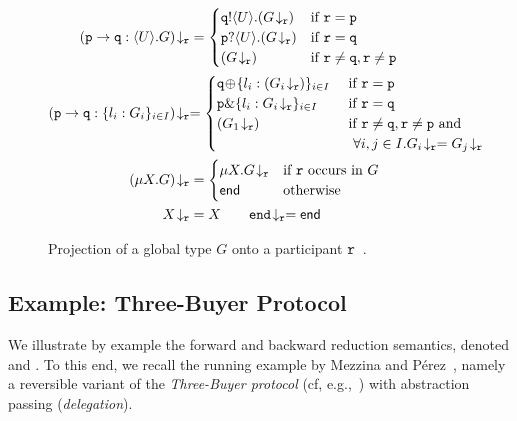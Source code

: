 \documentclass[runningheads,plain]{llncs}
\begin{document}
\begin{figure}[!t]
{
\begin{align*}
\tproj{(\gtcom{p}{q}{U}{G})}{\gpart{r}} & = 
\begin{cases}
\ltout{q}{U}{(\tproj{G}{\gpart{r}})} & \text{if $\gpart{r} = \gpart{p}$} \\
\ltinp{p}{U}{(\tproj{G}{\gpart{r}})} & \text{if $\gpart{r} = \gpart{q}$} \\
(\tproj{G}{\gpart{r}}) &  \text{if $\gpart{r} \neq \gpart{q}, \gpart{r} \neq \gpart{p}$}
\end{cases}
\\
\tproj{(\gtcho{p}{q}{l_i}{G_i})}{\gpart{r}}  
& 
{= 
\begin{cases}
\ltsel{q}{\lbl_i}{(\tproj{G_i}{\gpart{r}})}{i}{I}  & \text{ if $\gpart{r} = \gpart{p}$} \\
\ltbra{p}{\lbl_i}{\tproj{G_i}{\gpart{r}}}{i}{I}  & \text{ if $\gpart{r} = \gpart{q}$} \\
(\tproj{{G_1}}{\gpart{r}}) &  \text{ if $\gpart{r} \neq \gpart{q}, \gpart{r} \neq \gpart{p}$ and} \\ 
& \text{~~$\forall i, j \in I. \tproj{{G_i}}{\gpart{r}} = \tproj{{G_j}}{\gpart{r}}$}
\end{cases}
}
\\
\tproj{(\mu X. G)}{\gpart{r}} &= 
\begin{cases}
\mu X. \tproj{G}{\gpart{r}} & \text{if $\gpart{r}$ occurs in $G$}
\\
\lend & \text{otherwise}
\end{cases}
\\
\tproj{X}{\gpart{r}} & = X
\qquad
\tproj{\gend}{\gpart{r}} = \lend
\end{align*}
}
\caption{Projection of a global type $G$ onto a participant $\mathtt{r}$~\cite{DBLP:conf/ppdp/MezzinaP17,DBLP:journals/corr/MezzinaP17}.\label{f:proj}}
\end{figure}

\subsection{Example: Three-Buyer Protocol}\label{ss:exam}

We illustrate by example the 
forward and backward reduction semantics, denoted \fw and \bk.
To this end, we recall the running example by Mezzina and P\'{e}rez~\cite{DBLP:conf/ppdp/MezzinaP17}, namely
  a reversible variant of the \emph{Three-Buyer protocol}  (cf, e.g.,~\cite{CDYP2015})
with abstraction passing (\emph{delegation}). 
\end{document}

